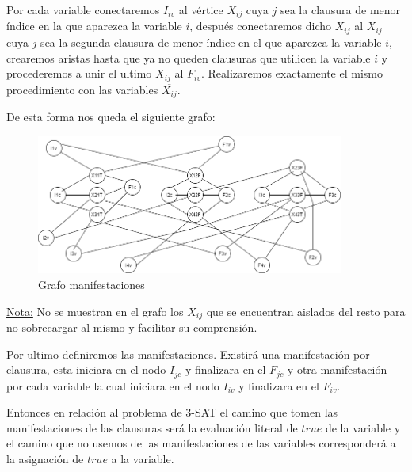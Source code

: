 Por cada variable conectaremos $I_{iv}$ al vértice $X_{ij}$ cuya $j$ sea la clausura de menor índice en la que aparezca la variable $i$, después conectaremos dicho $X_{ij}$ al $X_{ij}$ cuya $j$ sea la segunda clausura de menor índice en el que aparezca la variable $i$, crearemos aristas hasta que ya no queden clausuras que utilicen la variable $i$ y procederemos a unir el ultimo $X_{ij}$ al $F_{iv}$. Realizaremos exactamente el mismo procedimiento con las variables $\overline{X_{ij}}$. \newline

De esta forma nos queda el siguiente grafo: \newline

\begin{figure}[H]
\centering
\includegraphics[width=0.9\textwidth]{Informe/Imagenes/Parte1/grafico 2-bis.png}
\caption{\label{fig:class01} Grafo manifestaciones}
\end{figure}

\underline{Nota:} No se muestran en el grafo los $X_{ij}$ que se encuentran aislados del resto para no sobrecargar al mismo y facilitar su comprensión.\newline

Por ultimo definiremos las manifestaciones. Existirá una manifestación por clausura, esta iniciara en el nodo $I_{jc}$ y finalizara en el $F_{jc}$ y otra manifestación por cada variable la cual iniciara en el nodo $I_{iv}$ y finalizara en el $F_{iv}$.\newline

Entonces en relación al problema de 3-SAT el camino que tomen las manifestaciones de las clausuras será la evaluación literal de $true$ de la variable y el camino que no usemos de las manifestaciones de las variables corresponderá a la asignación de $true$ a la variable. \newline



